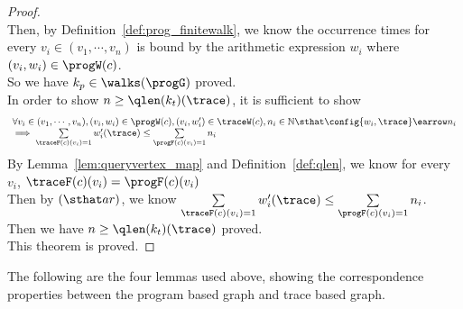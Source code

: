 \begin{proof}
\[\]
Then, by Definition~\ref{def:prog_finitewalk}, we know
the occurrence times for every $v_i \in (v_1, \cdots, v_n)$ 
is bound by the arithmetic expression $w_i$ where $(v_i, w_i) \in \progW(c)$.
\\
So we have $k_p \in \walks(\progG)$ proved.
\\
In order to show $ n \geq \qlen(k_t)(\trace) $, it is sufficient to show
\[
  \begin{array}{l}
  \forall v_i \in (v_1, \cdots, v_n),
  (v_i, w_i) \in \progW(c), (v_i, w'_i) \in \traceW(c), n_i \in \mathbb{N} 
  \sthat 
  \config{w_i, \trace} \earrow n_i
  \\
  \implies
   \sum\limits_{\traceF(c)(v_i) = 1}
   w'_i(\trace) 
   \leq 
   \sum\limits_{\progF(c)(v_i) = 1}n_i 
  \end{array}
  \]
By Lemma~\ref{lem:queryvertex_map} and Definition~\ref{def:qlen}, we know for every $v_i$, $\traceF(c)(v_i) = \progF(c)(v_i) $ 
\\
Then by $(\sthat ar)$, we know $  \sum\limits_{\traceF(c)(v_i) = 1}
w'_i(\trace) 
\leq 
\sum\limits_{\progF(c)(v_i) = 1}n_i $.
\\
Then we have $ n \geq \qlen(k_t)(\trace) $ proved.
\\
This theorem is proved.
\end{proof}
The following are the four lemmas used above,
showing the correspondence properties between the program based graph and trace based graph.

